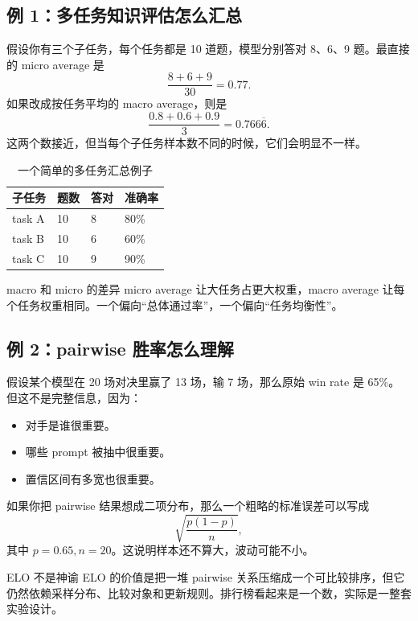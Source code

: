 \documentclass[a4paper]{article}
\begin{document}
\subsection{例 1：多任务知识评估怎么汇总}

假设你有三个子任务，每个任务都是 10 道题，模型分别答对 8、6、9 题。最直接的 micro average 是
\[
\frac{8+6+9}{30} = 0.77.
\]
如果改成按任务平均的 macro average，则是
\[
\frac{0.8+0.6+0.9}{3} = 0.766\overline{6}.
\]
这两个数接近，但当每个子任务样本数不同的时候，它们会明显不一样。

\begin{table}[H]
\centering
\begin{tabular}{p{2.8cm}p{2.6cm}p{2.6cm}p{2.6cm}}
\toprule
\textbf{子任务} & \textbf{题数} & \textbf{答对} & \textbf{准确率} \\
\midrule
task A & 10 & 8 & 80\% \\
task B & 10 & 6 & 60\% \\
task C & 10 & 9 & 90\% \\
\bottomrule
\end{tabular}
\caption{一个简单的多任务汇总例子}
\end{table}

\begin{knowledgebox}{macro 和 micro 的差异}
micro average 让大任务占更大权重，macro average 让每个任务权重相同。一个偏向“总体通过率”，一个偏向“任务均衡性”。
\end{knowledgebox}

\subsection{例 2：pairwise 胜率怎么理解}

假设某个模型在 20 场对决里赢了 13 场，输 7 场，那么原始 win rate 是 65\%。
但这不是完整信息，因为：
\begin{itemize}
    \item 对手是谁很重要。
    \item 哪些 prompt 被抽中很重要。
    \item 置信区间有多宽也很重要。
\end{itemize}

如果你把 pairwise 结果想成二项分布，那么一个粗略的标准误差可以写成
\[
\sqrt{\frac{p(1-p)}{n}},
\]
其中 $p=0.65, n=20$。这说明样本还不算大，波动可能不小。

\begin{importantbox}{ELO 不是神谕}
ELO 的价值是把一堆 pairwise 关系压缩成一个可比较排序，但它仍然依赖采样分布、比较对象和更新规则。排行榜看起来是一个数，实际是一整套实验设计。
\end{importantbox}
\end{document}

